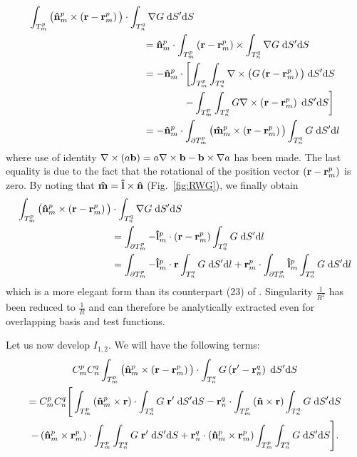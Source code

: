 \begin{equation}
\begin{split}
\int_{T_m^p} \big(\mathbf{\Hat{n}}_m^p \times \left(\mathbf{r}-\mathbf{r}_m^p \right) \big) &\cdot \int_{T_n^q} \nabla G \; \text{d} S' \text{d} S \\
&\qquad = \mathbf{\Hat{n}}_m^p \cdot \int_{T_m^p} \left(\mathbf{r}-\mathbf{r}_m^p \right) \times \int_{T_n^q} \nabla G \; \text{d} S' \text{d} S \\
&\qquad = - \mathbf{\Hat{n}}_m^p \cdot \left[ \int_{T_m^p} \int_{T_n^q} \nabla \times \big( G \left( \mathbf{r}-\mathbf{r}_m^p \right)\big) \; \text{d} S' \text{d} S \right. \\
& \qquad \qquad \qquad \left. - \int_{T_m^p} \int_{T_n^q} G \nabla \times \left( \mathbf{r}-\mathbf{r}_m^p \right) \; \text{d} S' \text{d} S\right] \\
&\qquad =  - \mathbf{\Hat{n}}_m^p \cdot \int_{\partial T_m^p} \big(\mathbf{\Hat{m}}_m^p \times  \left( \mathbf{r}-\mathbf{r}_m^p \right) \big) \int_{T_n^q}  G \; \text{d} S' \text{d} l 
\end{split}
\end{equation}
where use of identity $\nabla \times \left(a \mathbf{b}\right) = a \nabla \times \mathbf{b} - \mathbf{b} \times \nabla a$ has been made. The last equality is due to the fact that the rotational of the position vector $ \left( \mathbf{r}-\mathbf{r}_m^p \right)$ is zero. By noting that $\mathbf{\Hat{m}} = \mathbf{\Hat{l}} \times \mathbf{\Hat{n}}$ (Fig.\ \ref{fig:RWG}), we finally obtain
\begin{equation}
\begin{split}
\int_{T_m^p} \big(\mathbf{\Hat{n}}_m^p  \times \left(\mathbf{r}-\mathbf{r}_m^p \right) \big) &\cdot \int_{T_n^q} \nabla G \; \text{d} S' \text{d} S \\
& = \int_{\partial T_m^p} -\mathbf{\Hat{l}}_m^p \cdot  \left( \mathbf{r}-\mathbf{r}_m^p \right)  \int_{T_n^q}  G \; \text{d} S' \text{d} l \\
& = \int_{\partial T_m^p} -\mathbf{\Hat{l}}_m^p \cdot \mathbf{r}  \int_{T_n^q}  G \; \text{d} S' \text{d} l + \mathbf{r}_m^p \cdot \int_{\partial T_m^p}\mathbf{\Hat{l}}_m^p  \int_{T_n^q}  G \; \text{d} S' \text{d} l
\end{split}
\end{equation}
which is a more elegant form than its counterpart (23) of \cite{Taskinen_03}. Singularity $\frac{1}{R^2}$ has been reduced to $\frac{1}{R}$ and can therefore be analytically extracted even for overlapping basis and test functions. 
%
\par
Let us now develop $I_{1,2}$. We will have the following terms:
\begin{multline}
C_m^p C_n^q \int_{T_m^p} \big( \mathbf{\Hat{n}}_m^p \times \left(\mathbf{r} - \mathbf{r}_m^p \right)\big) \cdot \int_{T_n^q} G \left(\mathbf{r}'-\mathbf{r}_n^q \right) \; \text{d} S' \text{d} S \\
= C_m^p C_n^q  \Bigg[\int_{T_m^p} \left(\mathbf{\Hat{n}}_m^p \times \mathbf{r} \right) \cdot \int_{T_n^q} G \; \mathbf{r}' \; \text{d} S' \text{d} S - \mathbf{r}_n^q \cdot \int_{T_m^p} \left(\mathbf{\Hat{n}} \times \mathbf{r} \right) \int_{T_n^q} G \; \text{d} S' \text{d} S \\
- \left(\mathbf{\Hat{n}}_m^p \times \mathbf{r}_m^p\right)  \cdot \int_{T_m^p} \int_{T_n^q} G \; \mathbf{r}'\; \text{d} S' \text{d} S + \mathbf{r}_n^q \cdot \left(\mathbf{\Hat{n}}_m^p \times \mathbf{r}_m^p\right) \int_{T_m^p} \int_{T_n^q} G \; \text{d} S' \text{d} S \Bigg].
\end{multline}
